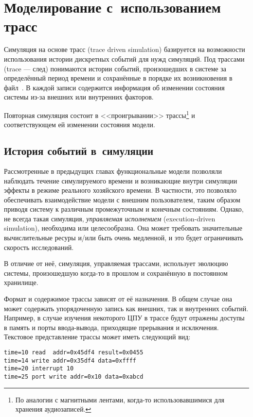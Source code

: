 \chapter{Моделирование с~использованием трасс}\label{chapter05}


Симуляция на основе трасс (\abbr trace driven simulation) базируется на возможности использования истории дискретных событий для нужд симуляций. Под трассами (\abbr trace --- след) понимаются истории событий, произошедших в системе за определённый период времени и сохранённые в порядке их возникновения в файл~\cite{DBLP:conf/ispass/RicoDCERV11}. В каждой записи содержится информация об изменении состояния системы из-за внешних или внутренних факторов. 

Повторная симуляция состоит в <<проигрывании>> трассы\footnote{По аналогии с магнитными лентами, когда-то использовавшимися для хранения аудиозаписей.} и соответствующем ей изменении состояния модели.

\section{История событий в~симуляции}

Рассмотренные в предыдущих главах функциональные модели позволяли наблюдать течение симулируемого времени и возникающие внутри симуляции эффекты в режиме реального хозяйского времени. В частности, это позволяло обеспечивать взаимодействие модели с внешним  пользователем, таким образом приводя систему к различным промежуточным и конечным состояниям. Однако, не всегда такая симуляция, \textit{управляемая исполнением} (\abbr execution-driven simulation), необходима или целесообразна. Она может требовать значительные вычислительные ресуры и/или быть очень медленной, и это будет ограничивать скорость исследований.

В отличие от неё, симуляция, управляемая трассами, использует эволюцию системы, произошедшую когда-то в прошлом и сохранённую в постоянном хранилище. 

Формат и содержимое трассы зависят от её назначения. В общем случае она может содержать упорядоченную запись как внешних, так и внутренних событий. Например, в случае изучения некоторого ЦПУ в трассе будут отражены доступы в память и порты ввода-вывода, приходящие прерывания и исключения. Текстовое представление трассы может иметь следующий вид:

\begin{lstlisting}
time=10 read  addr=0x45df4 result=0x0455
time=14 write addr=0x35df4 data=0xffff
time=20 interrupt 10
time=25 port write addr=0x10 data=0xabcd
\end{lstlisting}

